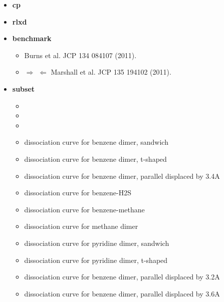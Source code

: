 \documentclass[letterpaper,10pt,english]{sphinxmanual}
\begin{document}
\begin{itemize}
\item {} 
\textbf{cp}   \textbar{}\textbar{} 

\item {} 
\textbf{rlxd} 

\item {} 
\textbf{benchmark}
\begin{itemize}
\item {} 
 Burns et al. JCP 134 084107 (2011).

\item {} 
$\Rightarrow$  $\Leftarrow$ Marshall et al. JCP 135 194102 (2011).

\end{itemize}

\item {} 
\textbf{subset}
\begin{itemize}
\item {} 

\item {} 

\item {} 

\item {} 
 dissociation curve for benzene dimer, sandwich

\item {} 
 dissociation curve for benzene dimer, t-shaped

\item {} 
 dissociation curve for benzene dimer, parallel displaced by 3.4A

\item {} 
 dissociation curve for benzene-H2S

\item {} 
 dissociation curve for benzene-methane

\item {} 
 dissociation curve for methane dimer

\item {} 
 dissociation curve for pyridine dimer, sandwich

\item {} 
 dissociation curve for pyridine dimer, t-shaped

\item {} 
 dissociation curve for benzene dimer, parallel displaced by 3.2A

\item {} 
 dissociation curve for benzene dimer, parallel displaced by 3.6A

\end{itemize}

\end{itemize}
\end{document}
